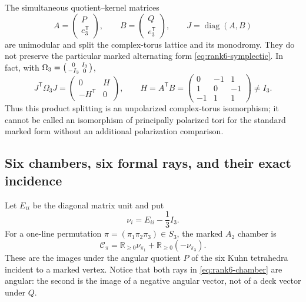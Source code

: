 \documentclass[11pt]{article}
\theoremstyle{definition}
\theoremstyle{remark}
\numberwithin{equation}{section}
\begin{document}
The simultaneous quotient--kernel matrices
\[
 A=\begin{pmatrix}P\\e_3^{\mathsf T}\end{pmatrix},
 \qquad B=\begin{pmatrix}Q\\e_3^{\mathsf T}\end{pmatrix},
 \qquad J=\operatorname{diag}(A,B)
\]
are unimodular and split the complex-torus lattice and its monodromy.  They
do not preserve the particular marked alternating form
\eqref{eq:rank6-symplectic}.  In fact, with
\(\Omega_3=\begin{psmallmatrix}0&I_3\\-I_3&0\end{psmallmatrix}\),
\begin{equation}
 J^{\mathsf T}\Omega_3J
 =\begin{pmatrix}0&H\\-H^{\mathsf T}&0\end{pmatrix},
 \qquad
 H=A^{\mathsf T}B=
 \begin{pmatrix}0&-1&1\\1&0&-1\\-1&1&1\end{pmatrix}\ne I_3.
                                                        \label{eq:rank6-j-not-symplectic}
\end{equation}
Thus this product splitting is an unpolarized complex-torus isomorphism; it
cannot be called an isomorphism of principally polarized tori for the
standard marked form without an additional polarization comparison.

\subsection{Six chambers, six formal rays, and their exact incidence}

Let \(E_{ii}\) be the diagonal matrix unit and put
\[
 \nu_i=E_{ii}-\frac13I_3.
\]
For a one-line permutation
\(\pi=(\pi_1\pi_2\pi_3)\in S_3\), the marked \(A_2\) chamber is
\begin{equation}
 \mathcal C_\pi
 =\mathbb R_{\geq0}\nu_{\pi_1}
  +\mathbb R_{\geq0}(-\nu_{\pi_3}).                    \label{eq:rank6-chamber}
\end{equation}
These are the images under the angular quotient \(P\) of the six Kuhn
tetrahedra incident to a marked vertex.  Notice that both rays in
\eqref{eq:rank6-chamber} are angular: the second is the image of a negative
angular vector, not of a deck vector under \(Q\).
\end{document}
